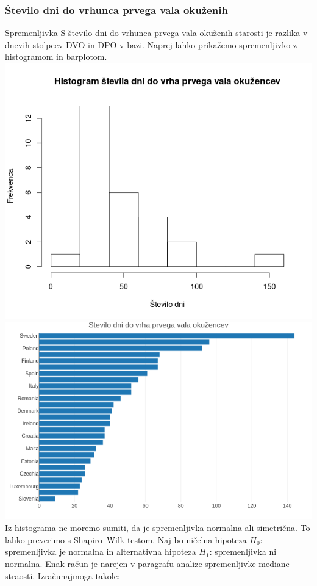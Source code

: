 \documentclass[a4paper,11pt]{article}
\begin{document}
\subsubsection{Število dni do vrhunca prvega vala okuženih}
Spremenljivka S število dni do vrhunca prvega vala okuženih starosti je razlika v dnevih stolpcev DVO in DPO v bazi. Naprej lahko prikažemo spremenljivko z histogramom in barplotom.
\includegraphics[scale=0.6]{histogram_st_dni_do_peaka_okuzencev}
\includegraphics[scale=0.6]{barplot_st_dni_do_peaka_okuzencev}
Iz histograma ne moremo sumiti, da je spremenljivka normalna ali simetrična. To lahko preverimo s Shapiro–Wilk testom. Naj bo ničelna hipoteza \(H_0\): spremenljivka je normalna in alternativna hipoteza \(H_1\): spremenljivka ni normalna. Enak račun je narejen v paragrafu analize spremenljivke mediane straosti. Izračunajmoga takole:
\end{document}
